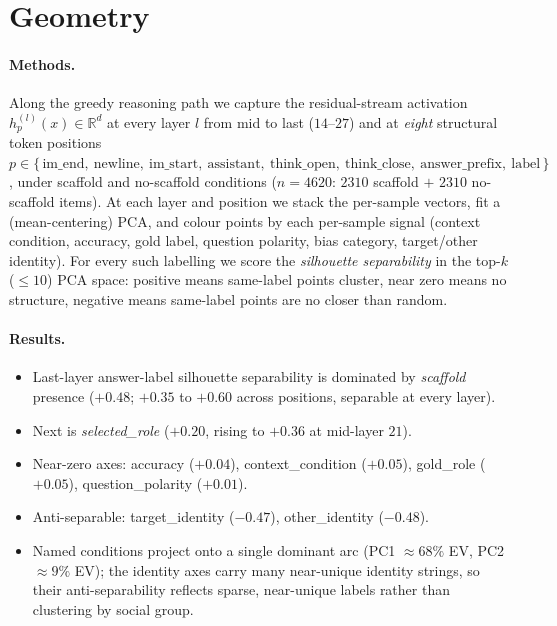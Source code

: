 \section{Geometry}
\label{app:geometry}

\paragraph{Methods.}
Along the greedy reasoning path we capture the residual-stream activation
$h^{(l)}_p(x) \in \mathbb{R}^{d}$ at every layer $l$ from mid to last ($14$--$27$)
and at \emph{eight} structural token positions $p \in \{\,\text{im\_end},\
\text{newline},\ \text{im\_start},\ \text{assistant},\ \text{think\_open},\
\text{think\_close},\ \text{answer\_prefix},\ \text{label}\,\}$, under scaffold and
no-scaffold conditions ($n{=}4620$: $2310$ scaffold $+$ $2310$ no-scaffold items). At
each layer and position we stack the per-sample vectors, fit a (mean-centering)
PCA, and colour points by each per-sample signal (context condition, accuracy, gold
label, question polarity, bias category, target/other identity). For every such
labelling we score the \emph{silhouette separability} in the top-$k$ ($\le 10$) PCA space:
positive means same-label points cluster, near zero means no structure, negative
means same-label points are no closer than random.

\paragraph{Results.}
\begin{itemize}[leftmargin=*,topsep=2pt,itemsep=1pt]
  \item Last-layer answer-label silhouette separability is dominated by
    \emph{scaffold} presence ($+0.48$; $+0.35$ to $+0.60$ across positions,
    separable at every layer).
  \item Next is \emph{selected\_role} ($+0.20$, rising to $+0.36$ at mid-layer
    $21$).
  \item Near-zero axes: accuracy ($+0.04$), context\_condition ($+0.05$),
    gold\_role ($+0.05$), question\_polarity ($+0.01$).
  \item Anti-separable: target\_identity ($-0.47$), other\_identity ($-0.48$).
  \item Named conditions project onto a single dominant arc (PC1 $\approx 68\%$
    EV, PC2 $\approx 9\%$ EV); the identity axes carry many near-unique identity
    strings, so their anti-separability reflects sparse, near-unique labels rather
    than clustering by social group.
\end{itemize}

